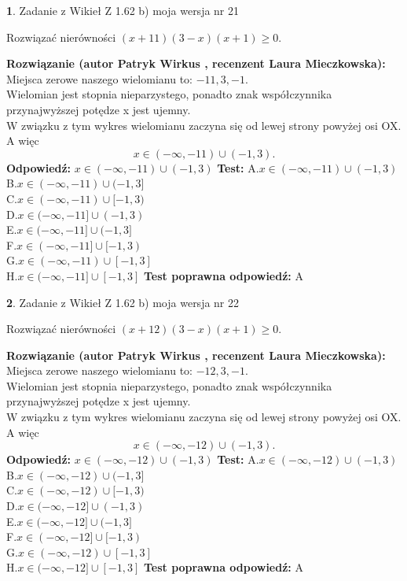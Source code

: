 \documentclass[12pt, a4paper]{article}
\theoremstyle{definition} %
\newtheorem{zad}{}
\newcommand{\zadStart}[1]{\begin{zad}#1\newline}
\newcommand{\zadStop}{\end{zad}}
\newcommand{\rozwStart}[2]{\noindent \textbf{Rozwiązanie (autor #1 , recenzent #2): }\newline}
\newcommand{\rozwStop}{\newline}
\newcommand{\odpStart}{\noindent \textbf{Odpowiedź:}\newline}
\newcommand{\odpStop}{\newline}
\newcommand{\testStart}{\noindent \textbf{Test:}\newline}
\newcommand{\testStop}{\newline}
\newcommand{\kluczStart}{\noindent \textbf{Test poprawna odpowiedź:}\newline}
\newcommand{\kluczStop}{\newline}
\begin{document}
\zadStart{Zadanie z Wikieł Z 1.62 b) moja wersja nr 21}

Rozwiązać nierówności $(x+11)(3-x)(x+1)\ge0$.
\zadStop
\rozwStart{Patryk Wirkus}{Laura Mieczkowska}
Miejsca zerowe naszego wielomianu to: $-11, 3, -1$.\\
Wielomian jest stopnia nieparzystego, ponadto znak współczynnika przy\linebreak najwyższej potędze x jest ujemny.\\ W związku z tym wykres wielomianu zaczyna się od lewej strony powyżej osi OX. A więc $$x \in (-\infty,-11) \cup (-1,3).$$
\rozwStop
\odpStart
$x \in (-\infty,-11) \cup (-1,3)$
\odpStop
\testStart
A.$x \in (-\infty,-11) \cup (-1,3)$\\
B.$x \in (-\infty,-11) \cup (-1,3]$\\
C.$x \in (-\infty,-11) \cup [-1,3)$\\
D.$x \in (-\infty,-11] \cup (-1,3)$\\
E.$x \in (-\infty,-11] \cup (-1,3]$\\
F.$x \in (-\infty,-11] \cup [-1,3)$\\
G.$x \in (-\infty,-11) \cup [-1,3]$\\
H.$x \in (-\infty,-11] \cup [-1,3]$
\testStop
\kluczStart
A
\kluczStop



\zadStart{Zadanie z Wikieł Z 1.62 b) moja wersja nr 22}

Rozwiązać nierówności $(x+12)(3-x)(x+1)\ge0$.
\zadStop
\rozwStart{Patryk Wirkus}{Laura Mieczkowska}
Miejsca zerowe naszego wielomianu to: $-12, 3, -1$.\\
Wielomian jest stopnia nieparzystego, ponadto znak współczynnika przy\linebreak najwyższej potędze x jest ujemny.\\ W związku z tym wykres wielomianu zaczyna się od lewej strony powyżej osi OX. A więc $$x \in (-\infty,-12) \cup (-1,3).$$
\rozwStop
\odpStart
$x \in (-\infty,-12) \cup (-1,3)$
\odpStop
\testStart
A.$x \in (-\infty,-12) \cup (-1,3)$\\
B.$x \in (-\infty,-12) \cup (-1,3]$\\
C.$x \in (-\infty,-12) \cup [-1,3)$\\
D.$x \in (-\infty,-12] \cup (-1,3)$\\
E.$x \in (-\infty,-12] \cup (-1,3]$\\
F.$x \in (-\infty,-12] \cup [-1,3)$\\
G.$x \in (-\infty,-12) \cup [-1,3]$\\
H.$x \in (-\infty,-12] \cup [-1,3]$
\testStop
\kluczStart
A
\kluczStop
\end{document}
